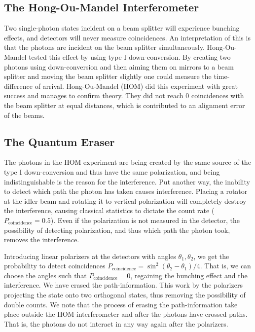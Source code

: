 \subsection{The Hong-Ou-Mandel Interferometer}
Two single-photon states incident on a beam splitter will experience bunching effects, and detectors will never measure coincidences. An interpretation of this is that the photons are incident on the beam splitter simultaneously.  Hong-Ou-Mandel tested this effect by using type I down-conversion. By creating two photons using down-conversion and then aiming them on mirrors to a beam splitter and moving the beam splitter slightly one could measure the time-difference of arrival. Hong-Ou-Mandel (HOM) did this experiment with great success and manages to confirm theory. They did not reach 0 coincidences with the beam splitter at equal distances, which is contributed to an alignment error of the beams.

\subsection{The Quantum Eraser}
The photons in the HOM experiment are being created by the same source of the type I down-conversion and thus have the same polarization, and being indistinguishable is the reason for the interference. Put another way, the inability to detect which path the photon has taken causes interference. Placing a rotator at the idler beam and rotating it to vertical polarization will completely destroy the interference, causing classical statistics to dictate the count rate ($P_\text{coincidence} = 0.5$). Even if the polarization is not measured in the detector, the possibility of detecting polarization, and thus which path the photon took, removes the interference.

Introducing linear polarizers at the detectors with angles $\theta_1,\theta_2$, we get the probability to detect coincidences $P_\text{coincidence} = \sin^2(\theta_2 - \theta_1)/4$. That is, we can choose the angles such that $P_\text{coincidence} = 0$, regaining the bunching effect and the interference. We have erased the path-information. This work by the polarizers projecting the state onto two orthogonal states, thus removing the possibility of double counts. We note that the process of erasing the path-information take place outside the HOM-interferometer and after the photons have crossed paths. That is, the photons do not interact in any way again after the polarizers.

